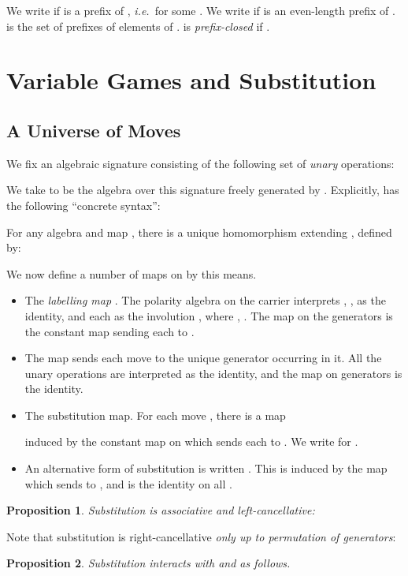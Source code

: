 \documentclass[a4paper,11pt]{article}
\newtheorem{proposition}{Proposition}[section]
\begin{document}
We
write  if  is a prefix of , {\em i.e.}\ 
for some . We write  if  is an even-length prefix of .
 is the set of prefixes of elements of .
 is {\em prefix-closed} if .




\section{Variable Games and Substitution}
\subsection{A Universe of Moves}
We fix an algebraic signature consisting of the following set of
\emph{unary} operations:

We take  to be the algebra over this signature freely generated
by . Explicitly,  has the following ``concrete syntax'':

For any algebra  and map , there is a unique
homomorphism  extending , defined
by:

We now define a number of maps on  by this means.
\begin{itemize}
\item
The \emph{labelling map} .
The polarity algebra on the carrier  interprets ,
,  as the identity, and each  as the involution
, where , . The map on the
generators is the constant map sending each  to .

\item
The map  sends each move to the
unique generator occurring in it. All the unary operations are
interpreted as the identity, and the map on generators is the
identity.

\item
The substitution map. For each move , there is a map

induced by the constant map on  which sends each  to
. We write  for .

\item
An alternative form of substitution is written . This is
induced by the map which sends  to , and is the identity on
all .
\end{itemize}

\begin{proposition}
Substitution is associative and left-cancellative:

\end{proposition}
Note that substitution is right-cancellative \emph{only up to
  permutation of generators}:


\begin{proposition}
\label{sublr}
Substitution interacts with  and  as follows.

\end{proposition}
\end{document}
